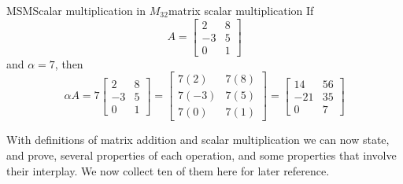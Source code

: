 \begin{example}{MSM}{Scalar multiplication in $M_{32}$}{matrix scalar multiplication}
If
%
\begin{equation*}
A=
\begin{bmatrix}
2&8\\
-3&5\\0&1
\end{bmatrix}
\end{equation*}
%
and $\alpha=7$, then
%
\begin{equation*}
\alpha A=
7\begin{bmatrix}2&8\\-3&5\\0&1\end{bmatrix}=
\begin{bmatrix}7(2)&7(8)\\7(-3)&7(5)\\7(0)&7(1)\end{bmatrix}=
\begin{bmatrix}14&56\\-21&35\\0&7\end{bmatrix}
\end{equation*}
%
\end{example}
%
%
%
%
With definitions of matrix addition and scalar multiplication we can now state, and prove, several properties of each operation, and some properties that involve their interplay.  We now collect ten of them here for later reference.
%
%
